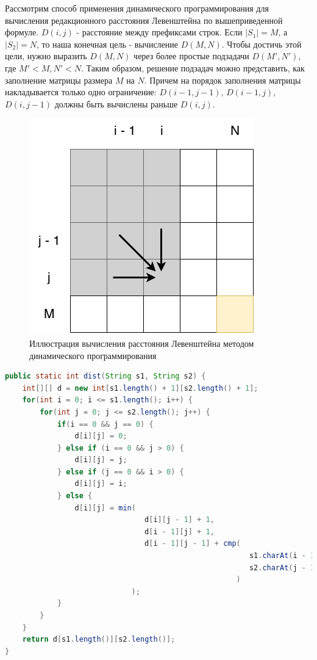 Рассмотрим способ применения динамического программирования для вычисления редакционного расстояния Левенштейна по вышеприведенной формуле. \(D(i, j)\) - расстояние между префиксами строк. Если \(|S_1| = M\), а \(|S_2| = N\), то наша конечная цель - вычисление \(D(M, N)\). Чтобы достичь этой цели, нужно выразить \(D(M, N)\) через более простые подзадачи \(D(M', N')\), где \(M' < M, N' < N\). Таким образом, решение подзадач можно представить, как заполнение матрицы размера \(M\) на \(N\). Причем на порядок заполнения матрицы накладывается только одно ограничение: \(D(i - 1, j - 1)\), \(D(i - 1, j)\), \(D(i, j - 1)\) должны быть вычислены раньше \(D(i, j)\).
\begin{figure}[H]
	\centering
	\includegraphics[scale=0.5]{img/levenstein.png}
	\caption{Иллюстрация вычисления расстояния Левенштейна методом динамического программирования}
\end{figure}
\begin{lstlisting}[caption={Пример реализации вычисления расстояния Левенштейна}, language=Java]
public static int dist(String s1, String s2) {
    int[][] d = new int[s1.length() + 1][s2.length() + 1];
    for(int i = 0; i <= s1.length(); i++) {
        for(int j = 0; j <= s2.length(); j++) {
            if(i == 0 && j == 0) {
                d[i][j] = 0;
            } else if (i == 0 && j > 0) {
                d[i][j] = j;
            } else if (j == 0 && i > 0) {
                d[i][j] = i;
            } else {
                d[i][j] = min(
                				d[i][j - 1] + 1, 
                				d[i - 1][j] + 1,
                        		d[i - 1][j - 1] + cmp(
                        								s1.charAt(i - 1), 
                        								s2.charAt(j - 1)
                        							 )
                        	 );
            }
        }
    }
    return d[s1.length()][s2.length()];
}
\end{lstlisting}

